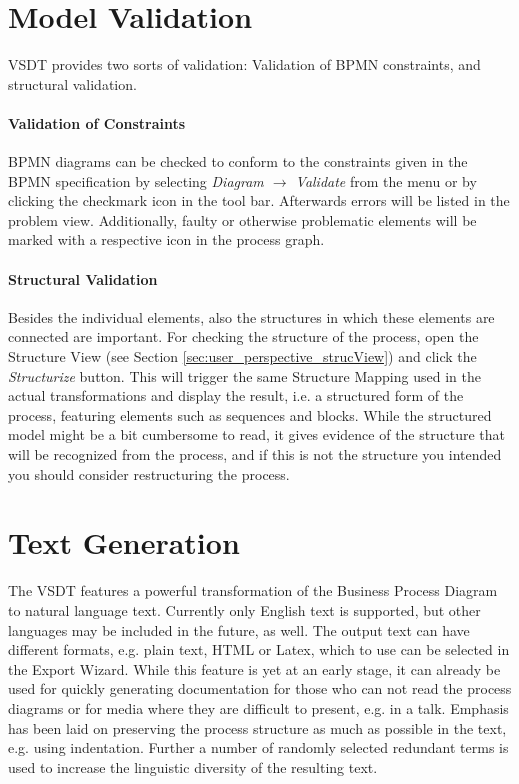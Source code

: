 \section{Model Validation}
\label{sec:user_features_validate}

VSDT provides two sorts of validation: Validation of BPMN constraints, and structural validation.

\paragraph{Validation of Constraints}
BPMN diagrams can be checked to conform to the constraints given in the BPMN specification by
selecting \emph{Diagram $\rightarrow$ Validate} from the menu or by clicking the checkmark icon in
the tool bar. Afterwards errors will be listed in the problem view. Additionally, faulty or
otherwise problematic elements will be marked with a respective icon in the process graph.

\paragraph{Structural Validation}
Besides the individual elements, also the structures in which these elements are connected are
important. For checking the structure of the process, open the Structure View (see Section
\ref{sec:user_perspective_strucView}) and click the \emph{Structurize} button. This will trigger the
same Structure Mapping used in the actual transformations and display the result, i.e. a structured
form of the process, featuring elements such as sequences and blocks. While the structured model
might be a bit cumbersome to read, it gives evidence of the structure that will be recognized from
the process, and if this is not the structure you intended you should consider restructuring the
process.



\section{Text Generation}
\label{sec:user_features_text}
 
The VSDT features a powerful transformation of the Business Process Diagram to natural language
text. Currently only English text is supported, but other languages may be included in the future,
as well. The output text can have different formats, e.g. plain text, HTML or Latex, which to use
can be selected in the Export Wizard. While this feature is yet at an early stage, it can already be
used for quickly generating documentation for those who can not read the process diagrams or for
media where they are difficult to present, e.g. in a talk. Emphasis has been laid on preserving the
process structure as much as possible in the text, e.g. using indentation. Further a number of
randomly selected redundant terms is used to increase the linguistic diversity of the resulting
text.


